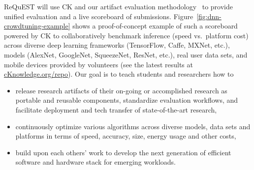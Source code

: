 ReQuEST will use CK and our artifact evaluation methodology~\cite{ctuning-ae1} 
to provide unified evaluation and a live scoreboard of submissions. 
%
Figure~\ref{fig:dnn-crowdtuning-example} shows a proof-of-concept example of such a
scoreboard powered by CK to collaboratively benchmark inference (speed vs.\ platform cost) 
across diverse deep learning frameworks (TensorFlow, Caffe, MXNet, etc.), 
models (AlexNet, GoogleNet, SqueezeNet, ResNet, etc.), real user data sets, and mobile devices 
provided by volunteers (see the latest results at \href{http://cknowledge.org/repo}{cKnowledge.org/repo}).
%
Our goal is to teach students and researchers how to 
\begin{itemize}
  \item release research artifacts of their on-going or accomplished research
as portable and reusable components, standardize evaluation workflows, 
and facilitate deployment and tech transfer of state-of-the-art research,
  \item continuously optimize various algorithms
across diverse models, data sets and platforms in terms of speed, accuracy,
size, energy usage and other costs,
  \item build upon each others' work to develop the next generation 
of efficient software and hardware stack for emerging workloads.
\end{itemize}

